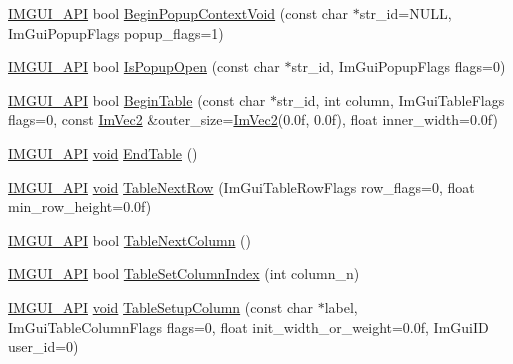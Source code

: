 \begin{DoxyCompactItemize}
\item 
\hyperlink{imgui_8h_a43829975e84e45d1149597467a14bbf5}{I\+M\+G\+U\+I\+\_\+\+A\+PI} bool \hyperlink{namespaceImGui_a6758a456204101a9c4a660da4cfba2c9}{Begin\+Popup\+Context\+Void} (const char $\ast$str\+\_\+id=N\+U\+LL, Im\+Gui\+Popup\+Flags popup\+\_\+flags=1)
\item 
\hyperlink{imgui_8h_a43829975e84e45d1149597467a14bbf5}{I\+M\+G\+U\+I\+\_\+\+A\+PI} bool \hyperlink{namespaceImGui_a0e351145d0936e79948094166757712e}{Is\+Popup\+Open} (const char $\ast$str\+\_\+id, Im\+Gui\+Popup\+Flags flags=0)
\item 
\hyperlink{imgui_8h_a43829975e84e45d1149597467a14bbf5}{I\+M\+G\+U\+I\+\_\+\+A\+PI} bool \hyperlink{namespaceImGui_a04ee4f6866b8e10b98008e7f19d35796}{Begin\+Table} (const char $\ast$str\+\_\+id, int column, Im\+Gui\+Table\+Flags flags=0, const \hyperlink{structImVec2}{Im\+Vec2} \&outer\+\_\+size=\hyperlink{structImVec2}{Im\+Vec2}(0.\+0f, 0.\+0f), float inner\+\_\+width=0.\+0f)
\item 
\hyperlink{imgui_8h_a43829975e84e45d1149597467a14bbf5}{I\+M\+G\+U\+I\+\_\+\+A\+PI} \hyperlink{imgui__impl__opengl3__loader_8h_ac668e7cffd9e2e9cfee428b9b2f34fa7}{void} \hyperlink{namespaceImGui_a9c70aaa6464c2e51e6f3342da133ada1}{End\+Table} ()
\item 
\hyperlink{imgui_8h_a43829975e84e45d1149597467a14bbf5}{I\+M\+G\+U\+I\+\_\+\+A\+PI} \hyperlink{imgui__impl__opengl3__loader_8h_ac668e7cffd9e2e9cfee428b9b2f34fa7}{void} \hyperlink{namespaceImGui_a33511cbfe04b545a1a51b514ab6c208c}{Table\+Next\+Row} (Im\+Gui\+Table\+Row\+Flags row\+\_\+flags=0, float min\+\_\+row\+\_\+height=0.\+0f)
\item 
\hyperlink{imgui_8h_a43829975e84e45d1149597467a14bbf5}{I\+M\+G\+U\+I\+\_\+\+A\+PI} bool \hyperlink{namespaceImGui_ac9925e8335f55449b1be988829e37ba5}{Table\+Next\+Column} ()
\item 
\hyperlink{imgui_8h_a43829975e84e45d1149597467a14bbf5}{I\+M\+G\+U\+I\+\_\+\+A\+PI} bool \hyperlink{namespaceImGui_adfbeb33991944035737d413379ae8b1c}{Table\+Set\+Column\+Index} (int column\+\_\+n)
\item 
\hyperlink{imgui_8h_a43829975e84e45d1149597467a14bbf5}{I\+M\+G\+U\+I\+\_\+\+A\+PI} \hyperlink{imgui__impl__opengl3__loader_8h_ac668e7cffd9e2e9cfee428b9b2f34fa7}{void} \hyperlink{namespaceImGui_a4ac0fd352082b1aa9a2a5a1dedcf5b89}{Table\+Setup\+Column} (const char $\ast$label, Im\+Gui\+Table\+Column\+Flags flags=0, float init\+\_\+width\+\_\+or\+\_\+weight=0.\+0f, Im\+Gui\+I\+D user\+\_\+id=0)
\item 

\end{DoxyCompactItemize}
